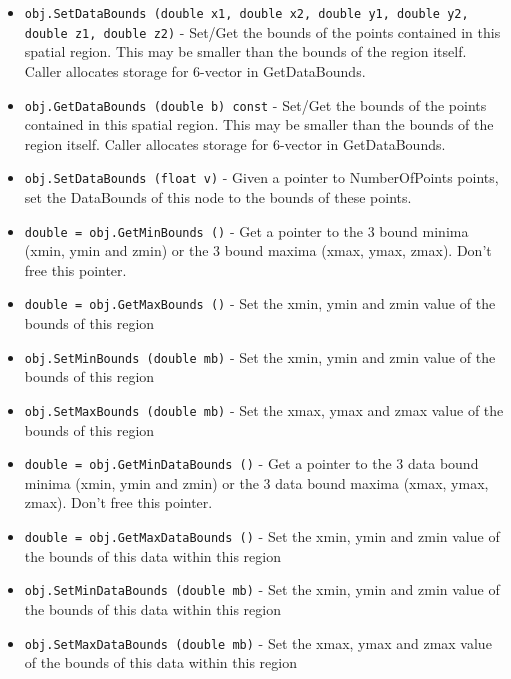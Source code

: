 \begin{itemize}
\item  \verb|obj.SetDataBounds (double x1, double x2, double y1, double y2, double z1, double z2)| -    Set/Get the bounds of the points contained in this spatial region.
   This may be smaller than the bounds of the region itself.
   Caller allocates storage for 6-vector in GetDataBounds.

\item  \verb|obj.GetDataBounds (double b) const| -    Set/Get the bounds of the points contained in this spatial region.
   This may be smaller than the bounds of the region itself.
   Caller allocates storage for 6-vector in GetDataBounds.

\item  \verb|obj.SetDataBounds (float v)| -    Given a pointer to NumberOfPoints points, set the DataBounds of this
   node to the bounds of these points.

\item  \verb|double = obj.GetMinBounds ()| -    Get a pointer to the 3 bound minima (xmin, ymin and zmin) or the
   3 bound maxima (xmax, ymax, zmax).  Don't free this pointer.

\item  \verb|double = obj.GetMaxBounds ()| -    Set the xmin, ymin and zmin value of the bounds of this region

\item  \verb|obj.SetMinBounds (double mb)| -    Set the xmin, ymin and zmin value of the bounds of this region

\item  \verb|obj.SetMaxBounds (double mb)| -    Set the xmax, ymax and zmax value of the bounds of this region

\item  \verb|double = obj.GetMinDataBounds ()| -    Get a pointer to the 3 data bound minima (xmin, ymin and zmin) or the
   3 data bound maxima (xmax, ymax, zmax).  Don't free this pointer.

\item  \verb|double = obj.GetMaxDataBounds ()| -    Set the xmin, ymin and zmin value of the bounds of this 
   data within this region

\item  \verb|obj.SetMinDataBounds (double mb)| -    Set the xmin, ymin and zmin value of the bounds of this 
   data within this region

\item  \verb|obj.SetMaxDataBounds (double mb)| -    Set the xmax, ymax and zmax value of the bounds of this 
   data within this region


\end{itemize}

